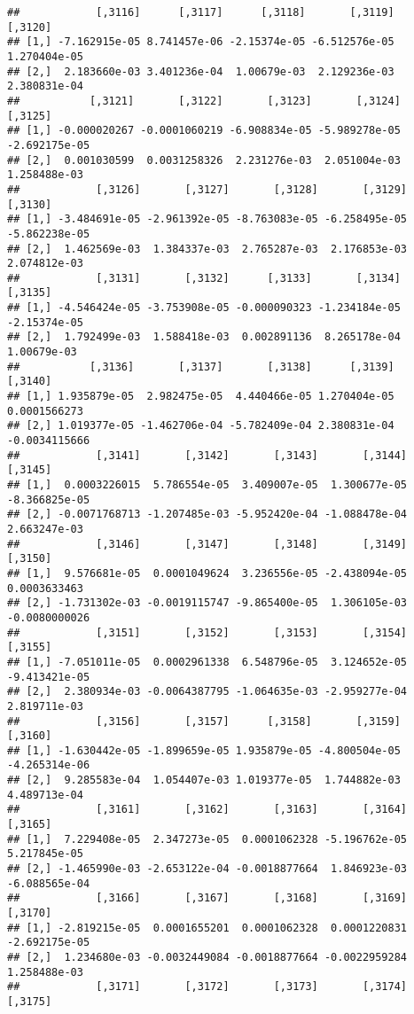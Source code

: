\documentclass[
]{article}
\begin{document}
\begin{verbatim}
##            [,3116]      [,3117]      [,3118]       [,3119]      [,3120]
## [1,] -7.162915e-05 8.741457e-06 -2.15374e-05 -6.512576e-05 1.270404e-05
## [2,]  2.183660e-03 3.401236e-04  1.00679e-03  2.129236e-03 2.380831e-04
##           [,3121]       [,3122]       [,3123]       [,3124]       [,3125]
## [1,] -0.000020267 -0.0001060219 -6.908834e-05 -5.989278e-05 -2.692175e-05
## [2,]  0.001030599  0.0031258326  2.231276e-03  2.051004e-03  1.258488e-03
##            [,3126]       [,3127]       [,3128]       [,3129]       [,3130]
## [1,] -3.484691e-05 -2.961392e-05 -8.763083e-05 -6.258495e-05 -5.862238e-05
## [2,]  1.462569e-03  1.384337e-03  2.765287e-03  2.176853e-03  2.074812e-03
##            [,3131]       [,3132]      [,3133]       [,3134]      [,3135]
## [1,] -4.546424e-05 -3.753908e-05 -0.000090323 -1.234184e-05 -2.15374e-05
## [2,]  1.792499e-03  1.588418e-03  0.002891136  8.265178e-04  1.00679e-03
##           [,3136]       [,3137]       [,3138]      [,3139]       [,3140]
## [1,] 1.935879e-05  2.982475e-05  4.440466e-05 1.270404e-05  0.0001566273
## [2,] 1.019377e-05 -1.462706e-04 -5.782409e-04 2.380831e-04 -0.0034115666
##            [,3141]       [,3142]       [,3143]       [,3144]       [,3145]
## [1,]  0.0003226015  5.786554e-05  3.409007e-05  1.300677e-05 -8.366825e-05
## [2,] -0.0071768713 -1.207485e-03 -5.952420e-04 -1.088478e-04  2.663247e-03
##            [,3146]       [,3147]       [,3148]       [,3149]       [,3150]
## [1,]  9.576681e-05  0.0001049624  3.236556e-05 -2.438094e-05  0.0003633463
## [2,] -1.731302e-03 -0.0019115747 -9.865400e-05  1.306105e-03 -0.0080000026
##            [,3151]       [,3152]       [,3153]       [,3154]       [,3155]
## [1,] -7.051011e-05  0.0002961338  6.548796e-05  3.124652e-05 -9.413421e-05
## [2,]  2.380934e-03 -0.0064387795 -1.064635e-03 -2.959277e-04  2.819711e-03
##            [,3156]       [,3157]      [,3158]       [,3159]       [,3160]
## [1,] -1.630442e-05 -1.899659e-05 1.935879e-05 -4.800504e-05 -4.265314e-06
## [2,]  9.285583e-04  1.054407e-03 1.019377e-05  1.744882e-03  4.489713e-04
##            [,3161]       [,3162]       [,3163]       [,3164]       [,3165]
## [1,]  7.229408e-05  2.347273e-05  0.0001062328 -5.196762e-05  5.217845e-05
## [2,] -1.465990e-03 -2.653122e-04 -0.0018877664  1.846923e-03 -6.088565e-04
##            [,3166]       [,3167]       [,3168]       [,3169]       [,3170]
## [1,] -2.819215e-05  0.0001655201  0.0001062328  0.0001220831 -2.692175e-05
## [2,]  1.234680e-03 -0.0032449084 -0.0018877664 -0.0022959284  1.258488e-03
##            [,3171]       [,3172]       [,3173]       [,3174]      [,3175]

\end{verbatim}
\end{document}
